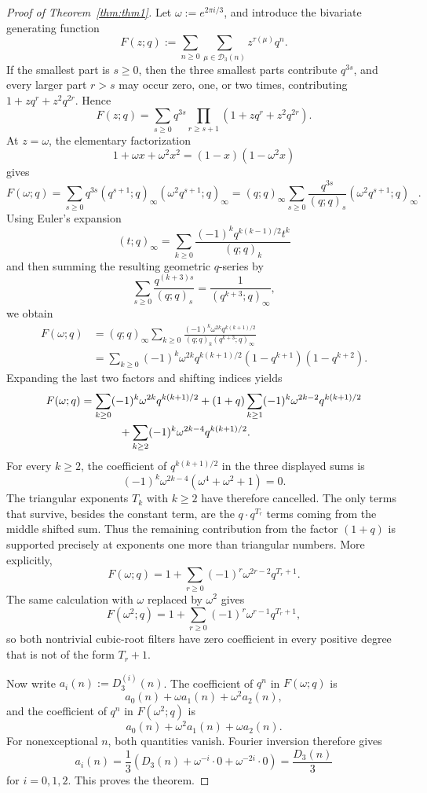 \documentclass[11pt]{amsart}
\theoremstyle{definition}
\theoremstyle{remark}
\newcommand{\D}{\mathcal D}
\begin{document}
\begin{proof}[Proof of Theorem~\ref{thm:thm1}]

Let $\omega:=e^{2\pi i/3}$, and introduce the bivariate generating function
\[
        F(z;q):=\sum_{n\ge0}\sum_{\mu\in\D_3(n)}z^{\tau(\mu)}q^n.
\]
If the smallest part is $s\ge0$, then the three smallest parts contribute $q^{3s}$, and every larger part $r>s$ may occur zero, one, or two times, contributing $1+zq^r+z^2q^{2r}$.  Hence
\[
        F(z;q)=\sum_{s\ge0}q^{3s}\prod_{r\ge s+1}(1+zq^r+z^2q^{2r}).
\]
At $z=\omega$, the elementary factorization
\[
        1+\omega x+\omega^2x^2=(1-x)(1-\omega^2x)
\]
gives
\[
        F(\omega;q)=\sum_{s\ge0}q^{3s}(q^{s+1};q)_\infty(\omega^2q^{s+1};q)_\infty
        =(q;q)_\infty\sum_{s\ge0}\frac{q^{3s}}{(q;q)_s}(\omega^2q^{s+1};q)_\infty.
\]
Using Euler's expansion
\[
        (t;q)_\infty=\sum_{k\ge0}\frac{(-1)^kq^{k(k-1)/2}t^k}{(q;q)_k}
\]
and then summing the resulting geometric $q$-series by
\[
        \sum_{s\ge0}\frac{q^{(k+3)s}}{(q;q)_s}=\frac1{(q^{k+3};q)_\infty},
\]
we obtain
\[
\begin{aligned}
        F(\omega;q)
        &= (q;q)_\infty\sum_{k\ge0}
        \frac{(-1)^k\omega^{2k}q^{k(k+1)/2}}{(q;q)_k(q^{k+3};q)_\infty} \\
        &= \sum_{k\ge0}(-1)^k\omega^{2k}q^{k(k+1)/2}(1-q^{k+1})(1-q^{k+2}).
\end{aligned}
\]
Expanding the last two factors and shifting indices yields
\[
\begin{aligned}
F(\omega;q)
&=\sum_{k\ge0}(-1)^k\omega^{2k}q^{k(k+1)/2}
 +(1+q)\sum_{k\ge1}(-1)^k\omega^{2k-2}q^{k(k+1)/2}  \\
&\hspace{3.5em}+\sum_{k\ge2}(-1)^k\omega^{2k-4}q^{k(k+1)/2}.
\end{aligned}
\]
For every $k\ge2$, the coefficient of $q^{k(k+1)/2}$ in the three displayed sums is
\[
        (-1)^k\omega^{2k-4}(\omega^4+\omega^2+1)=0.
\]
The triangular exponents $T_k$ with $k\ge2$ have therefore cancelled.  The only terms that survive, besides the constant term, are the $q\cdot q^{T_r}$ terms coming from the middle shifted sum.  Thus the remaining contribution from the factor $(1+q)$ is supported precisely at exponents one more than triangular numbers.  More explicitly,
\[
        F(\omega;q)=1+\sum_{r\ge0}(-1)^r\omega^{2r-2}q^{T_r+1}.
\]
The same calculation with $\omega$ replaced by $\omega^2$ gives
\[
        F(\omega^2;q)=1+\sum_{r\ge0}(-1)^r\omega^{r-1}q^{T_r+1},
\]
so both nontrivial cubic-root filters have zero coefficient in every positive degree that is not of the form $T_r+1$.

Now write $a_i(n):=D_3^{(i)}(n)$.  The coefficient of $q^n$ in $F(\omega;q)$ is
\[
        a_0(n)+\omega a_1(n)+\omega^2a_2(n),
\]
and the coefficient of $q^n$ in $F(\omega^2;q)$ is
\[
        a_0(n)+\omega^2 a_1(n)+\omega a_2(n).
\]
For nonexceptional $n$, both quantities vanish.  Fourier inversion therefore gives
\[
        a_i(n)=\frac13\left(D_3(n)+\omega^{-i}\cdot0+\omega^{-2i}\cdot0\right)=\frac{D_3(n)}3
\]
for $i=0,1,2$.  This proves the theorem.  
\end{proof}
\end{document}
